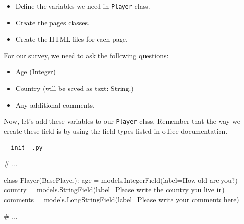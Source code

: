 \documentclass[
  letterpaper,
  DIV=11,
  numbers=noendperiod]{scrreprt}
\newenvironment{Shaded}{\begin{snugshade}}{\end{snugshade}}
\newcommand{\CommentTok}[1]{\textcolor[rgb]{0.37,0.37,0.37}{#1}}
\newcommand{\KeywordTok}[1]{\textcolor[rgb]{0.00,0.23,0.31}{#1}}
\newcommand{\NormalTok}[1]{\textcolor[rgb]{0.00,0.23,0.31}{#1}}
\newcommand{\OperatorTok}[1]{\textcolor[rgb]{0.37,0.37,0.37}{#1}}
\newcommand{\StringTok}[1]{\textcolor[rgb]{0.13,0.47,0.30}{#1}}
\providecommand{\tightlist}{%
  \setlength{\itemsep}{0pt}\setlength{\parskip}{0pt}}\usepackage{longtable,booktabs,array}
\begin{document}
\begin{itemize}
\tightlist
\item
  Define the variables we need in \texttt{Player} class.
\item
  Create the pages classes.
\item
  Create the HTML files for each page.
\end{itemize}

For our survey, we need to ask the following questions:

\begin{itemize}
\tightlist
\item
  Age (Integer)
\item
  Country (will be saved as text: String.)
\item
  Any additional comments.
\end{itemize}

Now, let's add these variables to our \texttt{Player} class. Remember
that the way we create these field is by using the field types listed in
oTree
\href{https://otree.readthedocs.io/en/latest/models.html\#field-types}{documentation}.

\begin{codelisting}

\caption{\texttt{__init__.py}}

\begin{Shaded}
\begin{Highlighting}[]
\CommentTok{\# ...}

\KeywordTok{class}\NormalTok{ Player(BasePlayer):}
\NormalTok{    age }\OperatorTok{=}\NormalTok{ models.IntegerField(label}\OperatorTok{=}\StringTok{\textquotesingle{}How old are you?\textquotesingle{}}\NormalTok{)}
\NormalTok{    country }\OperatorTok{=}\NormalTok{ models.StringField(label}\OperatorTok{=}\StringTok{\textquotesingle{}Please write the country you live in\textquotesingle{}}\NormalTok{)}
\NormalTok{    comments }\OperatorTok{=}\NormalTok{ models.LongStringField(label}\OperatorTok{=}\StringTok{\textquotesingle{}Please write your comments here\textquotesingle{}}\NormalTok{)}

\CommentTok{\# ...}
\end{Highlighting}
\end{Shaded}

\end{codelisting}
\end{document}
